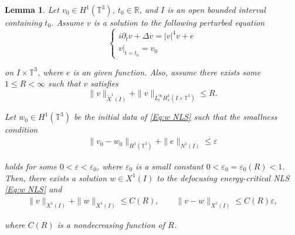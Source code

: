\documentclass[letterpaper, 11pt,  reqno]{amsart}
\newtheorem{lemma}[theorem]{Lemma}
\newcommand{\1}{\hspace{0.5mm}\text{I}\hspace{0.5mm}}
\newcommand{\noi}{\noindent}
\newcommand{\R}{\mathbb{R}}
\newcommand{\T}{\mathbb{T}}
\newcommand{\eps}{\varepsilon}
\newcommand{\wt}{\widetilde}
\newcommand{\pa}{\partial}
\numberwithin{equation}{section}
\numberwithin{theorem}{section}
\begin{document}
\begin{lemma}\label{Lem:Per}
Let $v_0\in H^1(\T^3)$, $t_0 \in \R$, and $I$ is an open bounded interval containing  $t_0$. 
Assume $v$ is a solution to the following perturbed equation 
\begin{equation*}
\begin{cases}
    i\pa_t v+\Delta v=|v|^4v+e\\
    v|_{t=t_0}=v_0
\end{cases}
\end{equation*}



\noi
on $I\times\T^3$,
where $e$ is an given function.
Also, assume there exists some  $1\leq  R<\infty$ such that
 $v$ satisfies 
\begin{equation*}
    \|v\|_{\wt X^1(I)}
    +\|v\|_{L_t^\infty H_x^1(I\times\T^3)}\leq R.
\end{equation*}

 
\noi
Let $w_0\in H^1(\T^3)$ be the initial data of \eqref{Eq:w NLS} such that the smallness condition
\begin{align}
\label{eq_smallness}
\|v_0-w_0\|_{H^1(\T^3)}
+\|e \|_{N^1(I)}
\leq \eps
\end{align}




\noi
holds for some $0<\eps<\eps_0$, 
where $\eps_0$ is a small constant 
$0<\eps_0=\eps_0(R)<1$.
Then, there exists a solution $w\in X^1(I)$ to the 
defocusing energy-critical NLS \eqref{Eq:w NLS} and
\begin{align*}
\|v\|_{X^1(I)}+\|w\|_{X^1(I)}\leq C(R),
\quad
\quad
\|v-w\|_{X^1(I)}\leq C(R)\eps,
\end{align*}


\noi
where $C(R)$ is a nondecreasing function of $R$.
\end{lemma}













\end{document}
